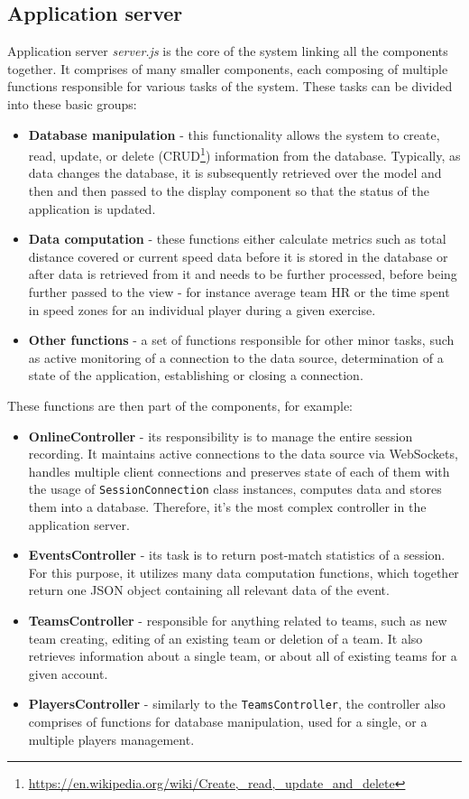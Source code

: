 \subsection{Application server}
Application server \textit{server.js} is the core of the system linking all the components together. It comprises of many smaller components, each composing of multiple functions responsible for various tasks of the system. These tasks can be divided into these basic groups:

\begin{itemize}
\item \textbf{Database manipulation} - this functionality allows the system to create, read, update, or delete (CRUD\footnote{\url{https://en.wikipedia.org/wiki/Create,_read,_update_and_delete}}) information from the database. Typically, as data changes the database, it is subsequently retrieved over the model and then and then passed to the display component so that the status of the application is updated.
\item \textbf{Data computation} - these functions either calculate metrics such as total distance covered or current speed data before it is stored in the database or after data is retrieved from it and needs to be further processed, before being further passed to the view - for instance average team HR or the time spent in speed zones for an individual player during a given exercise.
\item \textbf{Other functions} - a set of functions responsible for other minor tasks, such as active monitoring of a connection to the data source, determination of a state of the application, establishing or closing a connection.
\end{itemize}

These functions are then part of the components, for example:

\begin{itemize}
\item \textbf{OnlineController} - its responsibility is to manage the entire session recording. It maintains active connections to the data source via WebSockets, handles multiple client connections and preserves state of each of them with the usage of \texttt{Session\-Connection} class instances, computes data and stores them into a database. Therefore, it’s the most complex controller in the application server.
\item \textbf{EventsController} - its task is to return post-match statistics of a session. For this purpose, it utilizes many data computation functions, which together return one JSON object containing all relevant data of the event.
\item \textbf{TeamsController} - responsible for anything related to teams, such as new team creating, editing of an existing team or deletion of a team. It also retrieves information about a single team, or about all of existing teams for a given account.
\item \textbf{PlayersController} - similarly to the \texttt{TeamsController}, the controller also comprises of functions for database manipulation, used for a single, or a multiple players management.
\end{itemize}

